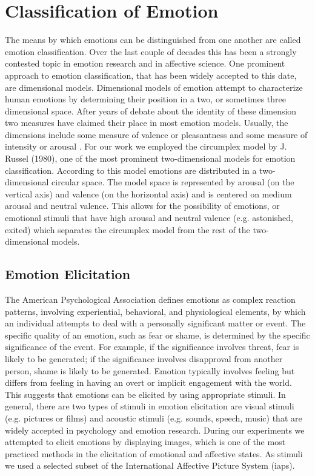 \section{Classification of Emotion}
The means by which emotions can be distinguished from one another are called emotion classification. Over the last couple of decades this has been a strongly contested topic in emotion research and in affective science. One prominent approach to emotion classification, that has been widely accepted to this date, are dimensional models. Dimensional models of emotion attempt to characterize human emotions by determining their position in a two, or sometimes three dimensional space. After years of debate about the identity of these dimension two measures have claimed their place in most emotion models. Usually, the dimensions include some measure of valence or pleasantness and some measure of intensity or arousal \cite{Rubin2009}. For our work we employed the circumplex model by J. Russel (1980), one of the most prominent two-dimensional models for emotion classification. According to this model emotions are distributed in a two-dimensional circular space. The model space is represented by arousal (on the vertical axis) and valence (on the horizontal axis) and is centered on medium arousal and neutral valence. This allows for the possibility of emotions, or emotional stimuli that have high arousal and neutral valence (e.g. astonished, exited) \cite{Rubin2009} which separates the circumplex model from the rest of the two-dimensional models.

\subsection{Emotion Elicitation}
The American Psychological Association defines emotions as complex reaction patterns, involving experiential, behavioral, and physiological elements, by which an individual attempts to deal with a personally significant matter or event. The specific quality of an emotion, such as fear or shame, is determined by the specific significance of the event. For example, if the significance involves threat, fear is likely to be generated; if the significance involves disapproval from another person, shame is likely to be generated. Emotion typically involves feeling but differs from feeling in having an overt or implicit engagement with the world. This suggests that emotions can be elicited by using appropriate stimuli. In general, there are two types of stimuli in emotion elicitation are visual stimuli (e.g. pictures or films) and acoustic stimuli (e.g. sounds, speech, music) that are widely accepted in psychology and emotion research. During our experiments we attempted to elicit emotions by displaying images, which is one of the most practiced methods in the elicitation of emotional and affective states. As stimuli we used a selected subset of the International Affective Picture System (\gls{iaps}).


